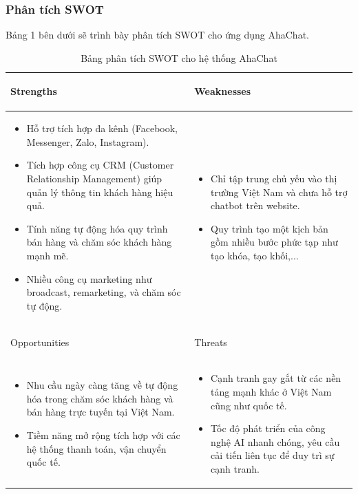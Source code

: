 \subsubsection{Phân tích SWOT}
Bảng 1 bên dưới sẽ trình bày phân tích SWOT cho ứng dụng AhaChat.
\begin{table}[H]
\centering
\begin{tabular}{|p{7cm}|p{7cm}|}
\hline
 \begin{center}
     Strengths
 \end{center} & \begin{center}
     Weaknesses
 \end{center}  \\
\hline
\begin{itemize}
    \item Hỗ trợ tích hợp đa kênh (Facebook,  Messenger, Zalo, Instagram).
    \item Tích hợp công cụ CRM (Customer Relationship Management) giúp quản lý thông tin khách hàng hiệu quả.
    \item Tính năng tự động hóa quy trình bán hàng và chăm sóc khách hàng mạnh mẽ.
    \item Nhiều công cụ marketing như broadcast, remarketing, và chăm sóc tự động.
\end{itemize} &  
\begin{itemize}
    \item Chỉ tập trung chủ yếu vào thị trường Việt Nam và chưa hỗ trợ chatbot trên website.
\item Quy trình tạo một kịch bản gồm nhiều bước phức tạp như tạo khóa, tạo khối,...
\end{itemize}\\
\hline
\begin{center}
    Opportunities
\end{center} & \begin{center}
    Threats
\end{center}\\
\hline
\begin{itemize}
    \item Nhu cầu ngày càng tăng về tự động hóa trong chăm sóc khách hàng và bán hàng trực tuyến tại Việt Nam.
    \item Tiềm năng mở rộng tích hợp với các hệ thống thanh toán, vận chuyển quốc tế.
\end{itemize} &  
\begin{itemize}
    \item Cạnh tranh gay gắt từ các nền tảng mạnh khác ở Việt Nam cũng như quốc tế.
    \item Tốc độ phát triển của công nghệ AI nhanh chóng, yêu cầu cải tiến liên tục để duy trì sự cạnh tranh.
\end{itemize}\\
\hline
\end{tabular}
\caption{Bảng phân tích SWOT cho hệ thống AhaChat}
\end{table}


